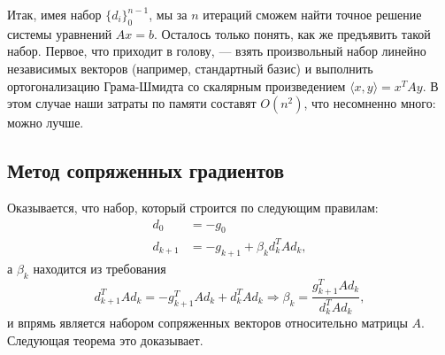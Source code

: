 \documentclass[a4paper, 12pt]{article}
\begin{document}
Итак, имея набор $\{d_i\}_0^{n-1}$, мы за $n$ итераций сможем найти точное решение системы уравнений $Ax = b$. Осталось только понять, как же предъявить такой набор. Первое, что приходит в голову, --- взять произвольный набор линейно независимых векторов (например, стандартный базис) и выполнить ортогонализацию Грама-Шмидта со скалярным произведением $\langle x, y \rangle = x^TAy$. В этом случае наши затраты по памяти составят $O(n^2)$, что несомненно много: можно лучше.

\subsection{Метод сопряженных градиентов}
Оказывается, что набор, который строится по следующим правилам:
\begin{align}\label{cgrad}
    d_0 &= -g_0 \\
    d_{k+1} &= -g_{k+1} + \beta_k d_k^TAd_k,
\end{align}
а $\beta_k$ находится из требования
$$d_{k+1}^TAd_k = -g_{k+1}^TAd_k + d_k^TAd_k \Rightarrow \beta_k = \frac{g_{k+1}^TAd_k}{d_k^TAd_k},$$
и впрямь является набором сопряженных векторов относительно матрицы $A$. Следующая теорема это доказывает.
\end{document}
